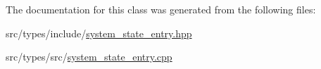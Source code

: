 The documentation for this class was generated from the following files\+:\begin{DoxyCompactItemize}
\item 
src/types/include/\hyperlink{system__state__entry_8hpp}{system\+\_\+state\+\_\+entry.\+hpp}\item 
src/types/src/\hyperlink{system__state__entry_8cpp}{system\+\_\+state\+\_\+entry.\+cpp}\end{DoxyCompactItemize}
